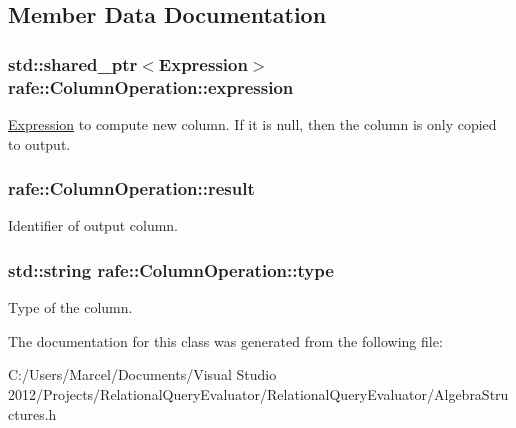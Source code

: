 \subsection{Member Data Documentation}
\hypertarget{classrafe_1_1_column_operation_a33bfeb4554709f96d9945cb2148f095b}{
\subsubsection[{expression}]{\setlength{\rightskip}{0pt plus 5cm}std\+::shared\+\_\+ptr$<${\bf Expression}$>$ rafe\+::\+Column\+Operation\+::expression}}\label{classrafe_1_1_column_operation_a33bfeb4554709f96d9945cb2148f095b}
\hyperlink{classrafe_1_1_expression}{Expression} to compute new column. If it is null, then the column is only copied to output. \hypertarget{classrafe_1_1_column_operation_a728c264bef7363a5bf0578c49654ea3b}{
\subsubsection[{result}]{ rafe\+::\+Column\+Operation\+::result}}\label{classrafe_1_1_column_operation_a728c264bef7363a5bf0578c49654ea3b}
Identifier of output column. \hypertarget{classrafe_1_1_column_operation_a1c85fd1a1f9465b33553cbdd6e641a51}{
\subsubsection[{type}]{\setlength{\rightskip}{0pt plus 5cm}std\+::string rafe\+::\+Column\+Operation\+::type}}\label{classrafe_1_1_column_operation_a1c85fd1a1f9465b33553cbdd6e641a51}
Type of the column. 

The documentation for this class was generated from the following file\+:\begin{DoxyCompactItemize}
\item 
C\+:/\+Users/\+Marcel/\+Documents/\+Visual Studio 2012/\+Projects/\+Relational\+Query\+Evaluator/\+Relational\+Query\+Evaluator/Algebra\+Structures.\+h\end{DoxyCompactItemize}
